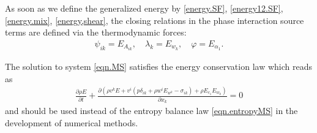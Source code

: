 \documentclass[3p,times,table]{article}
\begin{document}
As soon as we define the generalized energy by \eqref{energy.SF}, 
\eqref{energy12.SF}, \eqref{energy.mix}, \eqref{energy,shear}, the closing 
relations in the phase interaction source terms are defined via the 
thermodynamic 
forces:
\begin{align}
\psi_{ik}=E_{A_{ik}}, \quad \lambda_{k}=E_{w_k}, \quad \varphi=E_{\alpha_1}.
\end{align} 

The solution to system \eqref{eqn.MS} satisfies the energy conservation law 
which reads as
\begin{align} \label{eqn.energyMS}
\displaystyle\frac{\partial \rho E}{\partial t}+
\frac{\partial \left(\rho  v^k E +v^i(p \delta_{ik}+\rho w^i E_{w^k}-\sigma_{ik}) +\rho E_{c_1}E_{w_k} \right)}{\partial x_k}=0
\end{align}
and should be used instead of the entropy balance law \eqref{eqn.entropyMS} in the development of numerical methods. 
\end{document}
